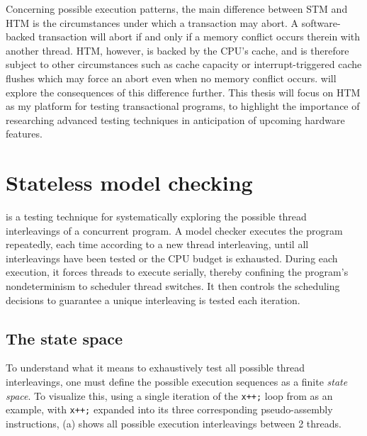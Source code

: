 Concerning possible execution patterns,
the main difference between STM and HTM is the circumstances under which a transaction may abort.
A software-backed transaction will abort if and only if a memory conflict occurs therein with another thread.
HTM, however, is backed by the CPU's cache, and is therefore subject to other circumstances such as cache capacity or interrupt-triggered cache flushes which may force an abort even when no memory conflict occurs.
 will explore the consequences of this difference further.
%
This thesis will focus on HTM as my platform for testing transactional programs,
to highlight the importance of researching advanced testing techniques in anticipation of upcoming hardware features.


\section{Stateless model checking}
\label{sec:overview-stateless} %

 is a testing technique for systematically exploring the possible thread interleavings of a concurrent program.
A model checker executes the program repeatedly, each time according to a new thread interleaving, until all interleavings have been tested or the CPU budget is exhausted.
During each execution, it forces threads to execute serially, thereby confining the program's nondeterminism to scheduler thread switches.
It then controls the scheduling decisions
to guarantee a unique interleaving is tested each iteration.

\subsection{The state space}
\label{sec:overview-statespace}

To understand what it means to exhaustively test all possible thread interleavings,
one must define the possible execution sequences as a finite {\em state space}.
To visualize this,
using a single iteration of the {\tt x++;} loop from  as an example,
with {\tt x++;} expanded into its three corresponding pseudo-assembly instructions,
(a) shows all possible execution interleavings
between 2 threads.

